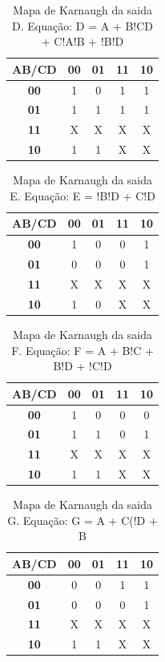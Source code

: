 \documentclass[12pts]{article}
\begin{document}
	\begin{table}[h]
	\centering	
	\begin{tabular}{|c|c|c|c|c|}
		\hline
		\textbf{AB/CD} & \textbf{00} & \textbf{01} & \textbf{11} & \textbf{10}\\
		\hline
		\textbf{00} & 1 & 0 & 1 & 1\\
		\hline
		\textbf{01} & 1 & 1 & 1 & 1\\
		\hline
		\textbf{11} & X & X & X & X\\
		\hline
		\textbf{10} & 1 & 1 & X & X\\
		\hline
	\end{tabular}
	\caption{Mapa de Karnaugh da saida D. Equação: D = A + B!CD + C!A!B + !B!D }
	\end{table}
	\singlespacing


	\begin{table}[h]
	\centering	
	\begin{tabular}{|c|c|c|c|c|}
		\hline
		\textbf{AB/CD} & \textbf{00} & \textbf{01} & \textbf{11} & \textbf{10}\\
		\hline
		\textbf{00} & 1 & 0 & 0 & 1\\
		\hline
		\textbf{01} & 0 & 0 & 0 & 1\\
		\hline
		\textbf{11} & X & X & X & X\\
		\hline
		\textbf{10} & 1 & 0 & X & X\\
		\hline
	\end{tabular}
	\caption{Mapa de Karnaugh da saida E. Equação: E = !B!D + C!D}
	\end{table}
	\singlespacing

	\begin{table}[h]
	\centering	
	\begin{tabular}{|c|c|c|c|c|}
		\hline
		\textbf{AB/CD} & \textbf{00} & \textbf{01} & \textbf{11} & \textbf{10}\\
		\hline
		\textbf{00} & 1 & 0 & 0 & 0\\
		\hline
		\textbf{01} & 1 & 1 & 0 & 1\\
		\hline
		\textbf{11} & X & X & X & X\\
		\hline
		\textbf{10} & 1 & 1 & X & X\\
		\hline
	\end{tabular}
	\caption{Mapa de Karnaugh da saida F. Equação: F = A + B!C + B!D + !C!D}
	\end{table}
	\singlespacing

	\newpage

	\begin{table}[h]
	\centering	
	\begin{tabular}{|c|c|c|c|c|}
		\hline
		\textbf{AB/CD} & \textbf{00} & \textbf{01} & \textbf{11} & \textbf{10}\\
		\hline
		\textbf{00} & 0 & 0 & 1 & 1\\
		\hline
		\textbf{01} & 0 & 0 & 0 & 1\\
		\hline
		\textbf{11} & X & X & X & X\\
		\hline
		\textbf{10} & 1 & 1 & X & X\\
		\hline
	\end{tabular}
	\caption{Mapa de Karnaugh da saida G. Equação: G = A + C(!D + B}
	\end{table}
	\singlespacing
\end{document}
